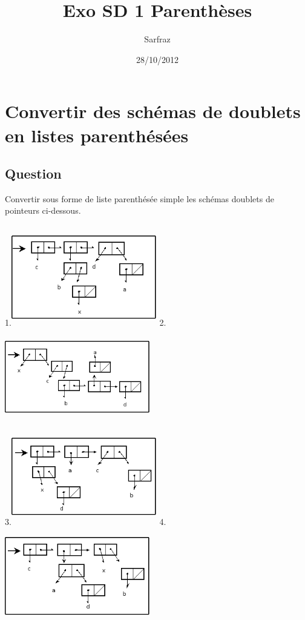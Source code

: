 \documentclass[a4paper, 11pt]{article}
\title{Exo SD 1 Parenthèses}
\author{Sarfraz \bsc{kapasi}}
\date{28/10/2012}
\begin{document}
%
\maketitle
%
\section{Convertir des schémas de doublets en listes parenthésées}
\subsection{Question}

Convertir sous forme de liste parenthésée simple les schémas doublets de pointeurs ci-dessous.\\\\
1.\includegraphics[height=120pt, width=180pt]{Pointeurs_Exo1.png}  2.\includegraphics[height=120pt, width=180pt]{Pointeurs_Exo2.png}\\
3.\includegraphics[height=120pt, width=180pt]{Pointeurs_Exo3.png}  4.\includegraphics[height=120pt, width=180pt]{Pointeurs_Exo4.png}\\
\end{document}

